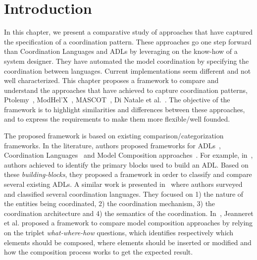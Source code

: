 \section{Introduction}
In this chapter, we present a comparative study of approaches that have captured the specification of a coordination pattern. These approaches go one step forward than Coordination Languages and ADLs by leveraging on the know-how of a system designer. They have automated the model coordination by specifying the coordination between languages. Current implementations seem different and not well characterized. This chapter proposes a framework to compare and understand the approaches that have achieved to capture coordination patterns, \ie Ptolemy~\cite{ptoleframebib}, ModHel'X~\cite{modhelxbib}, MASCOT~\cite{mascotbib}, Di Natale et al.~\cite{dinatale}. The objective of the framework is to highlight similarities and differences between these approaches, and to express the requirements to make them more flexible/well founded.

The proposed framework is based on existing comparison/categorization frameworks. In the literature, authors proposed frameworks for ADLs~\cite{frameadlsbib}, Coordination Languages~\cite{coordmodels} and Model Composition approaches~\cite{framecompoas}. For example, in~\cite{frameadlsbib}, authors achieved to identify the primary blocks used to build an ADL. Based on these \emph{building-blocks}, they proposed a framework in order to classify and compare several existing ADLs. A similar work is presented in~\cite{coordmodels} where authors surveyed and classified several coordination languages. They focused on 1) the nature of the entities being coordinated, 2) the coordination mechanism, 3) the coordination architecture and 4) the semantics of the coordination. In~\cite{framecompoas}, Jeanneret et al. proposed a framework to compare model composition approaches by relying on the triplet \emph{what-where-how} questions, which identifies respectively which elements should be composed, where elements should be inserted or modified and how the composition process works to get the expected result. 


